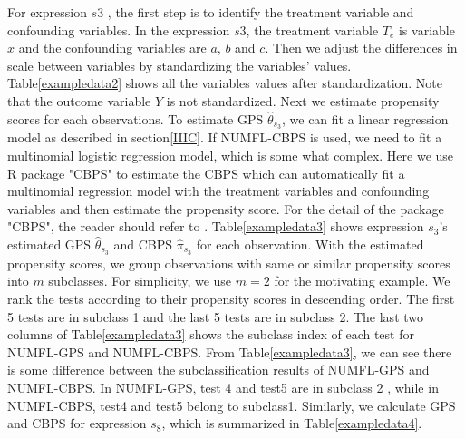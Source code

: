 \documentclass[times]{stvrauth}
\begin{document}
For expression $s3$ , the first step is to identify the treatment variable and confounding variables. In the expression $s3$, the treatment variable $T_e$ is variable $x$ and the confounding variables are $a$, $b$ and $c$. Then we adjust  the differences in scale between variables by standardizing the variables' values. Table\ref{exampledata2} shows all the variables values after standardization. Note that the outcome variable $Y$ is not standardized. Next we estimate propensity scores for each observations. To estimate GPS ${\hat{\theta}}_{s_3}$, we can fit a linear regression model as described in section\ref{IIIC}. If NUMFL-CBPS is used, we need to fit a multinomial logistic regression model, which is some what complex. Here we use R package "CBPS" to estimate the CBPS which can automatically fit a multinomial regression model with the treatment variables and confounding variables and then estimate the propensity score. For the detail of the package "CBPS", the reader should refer to \cite{CBPS}. Table\ref{exampledata3} shows expression $s_3$'s  estimated GPS ${\hat{\theta}}_{s_3}$ and CBPS ${\hat{\pi}}_{s_3}$ for each observation. With the estimated propensity scores, we group observations with same or similar propensity scores into $m$ subclasses. For simplicity, we use $m=2$ for the motivating example. We rank the tests according to their propensity scores in descending order. The first 5 tests are in subclass 1 and the last 5 tests are in subclass 2. The last two columns of Table\ref{exampledata3} shows the subclass index of each test for NUMFL-GPS and NUMFL-CBPS. From Table\ref{exampledata3}, we can see there is some difference between the subclassification results of NUMFL-GPS and NUMFL-CBPS. In NUMFL-GPS, test 4 and test5 are in subclass 2 , while in NUMFL-CBPS, test4 and test5 belong to subclass1.  Similarly, we calculate GPS and CBPS for expression $s_8$, which is summarized in Table\ref{exampledata4}.  
\end{document}
